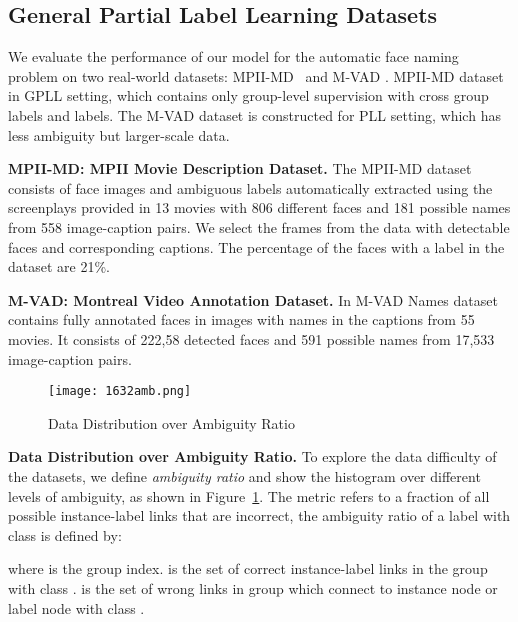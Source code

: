 \documentclass[letterpaper]{article} \usepackage{aaai20}  \usepackage{times}  \usepackage{helvet} \usepackage{courier}  \usepackage[hyphens]{url}  \usepackage{graphicx} \urlstyle{rm} \def\UrlFont{\rm}  \frenchspacing  \setlength{\pdfpagewidth}{8.5in}  \setlength{\pdfpageheight}{11in}  \frenchspacing
\begin{document}
\subsection{General Partial Label Learning Datasets} \label{sec:dataset}


We evaluate the performance of our model for the automatic face naming problem on two real-world datasets: MPII-MD~\cite{RohrbachCVPR2017} and M-VAD \cite{pini2019mvad}. MPII-MD dataset in GPLL setting, which contains only group-level supervision with cross group labels and  labels. The M-VAD dataset is constructed for PLL setting, which has less ambiguity but larger-scale data.







\noindent\textbf{MPII-MD: MPII Movie Description Dataset.}
The MPII-MD dataset consists of face images and ambiguous labels automatically extracted using the screenplays provided in 13 movies with 806 different faces and 181 possible names from 558 image-caption pairs. We select the frames from the data with detectable faces and corresponding captions. The percentage of the faces with a  label in the dataset are 21\%. 


\noindent\textbf{M-VAD: Montreal Video Annotation Dataset.}
In M-VAD Names dataset contains fully annotated faces in images with names in the captions from 55 movies. It consists of 222,58 detected faces and 591 possible names from 17,533 image-caption pairs. 


\begin{figure}[!th]
  \texttt{[image: 1632amb.png]}
\caption{Data Distribution over Ambiguity Ratio}
  \label{fig:dataratio}
\end{figure}

\noindent\textbf{Data Distribution over Ambiguity Ratio.}
To explore the data difficulty of the datasets, we define \textit{ambiguity ratio} and show the histogram over different levels of ambiguity, as shown in Figure~\ref{fig:dataratio}. The metric refers to a fraction of all possible instance-label links that are incorrect, the ambiguity ratio of a label with class  is defined by:

where  is the group index.  is the set of correct instance-label links in the group  with class .  is the set of wrong links in group  which connect to instance node or label node with class . 
\end{document}
